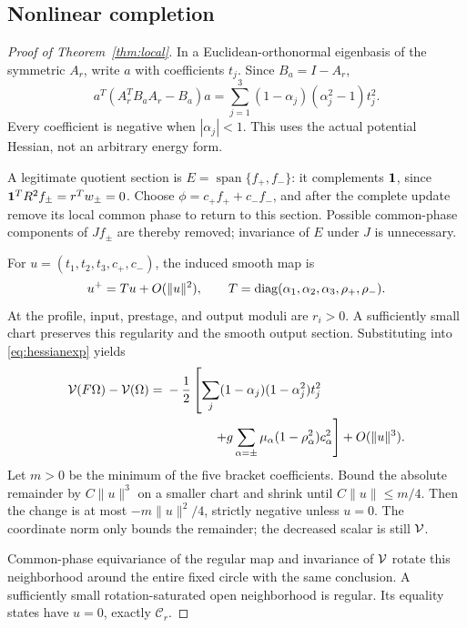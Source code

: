 \subsection{Nonlinear completion}
\begin{proof}[Proof of Theorem~\ref{thm:local}]
In a Euclidean-orthonormal eigenbasis of the symmetric \(A_r\), write \(a\) with coefficients \(t_j\). Since \(B_a=I-A_r\),
\begin{equation}
a^T(A_r^TB_aA_r-B_a)a
=\sum_{j=1}^3(1-\alpha_j)(\alpha_j^2-1)t_j^2.
\label{eq:amplitudedecrement}
\end{equation}
Every coefficient is negative when \(|\alpha_j|<1\). This uses the actual potential Hessian, not an arbitrary energy form.

A legitimate quotient section is \(E=\operatorname{span}\{f_+,f_-\}\): it complements \(\mathbf1\), since \(\mathbf1^TR^2f_\pm=r^Tw_\pm=0\). Choose \(\phi=c_+f_++c_-f_-\), and after the complete update remove its local common phase to return to this section. Possible common-phase components of \(Jf_\pm\) are thereby removed; invariance of \(E\) under \(J\) is unnecessary.

For \(u=(t_1,t_2,t_3,c_+,c_-)\), the induced smooth map is
\[
u^+=Tu+O(\|u\|^2),\qquad
T=\operatorname{diag}(\alpha_1,\alpha_2,\alpha_3,\rho_+,\rho_-).
\]
At the profile, input, prestage, and output moduli are \(r_i>0\). A sufficiently small chart preserves this regularity and the smooth output section. Substituting into \eqref{eq:hessianexp} yields
\begin{align}
\V(F\Omega)-\V(\Omega)
={}&-\frac12\left[
\sum_j(1-\alpha_j)(1-\alpha_j^2)t_j^2\right.\notag\\
&\left.\hspace{13mm}
+g\sum_{\alpha=\pm}\mu_\alpha(1-\rho_\alpha^2)c_\alpha^2
\right]+O(\|u\|^3).
\label{eq:nonlineardecrement}
\end{align}
Let \(m>0\) be the minimum of the five bracket coefficients. Bound the absolute remainder by \(C\|u\|^3\) on a smaller chart and shrink until \(C\|u\|\le m/4\). Then the change is at most \(-m\|u\|^2/4\), strictly negative unless \(u=0\). The coordinate norm only bounds the remainder; the decreased scalar is still \(\mathcal V\).

Common-phase equivariance of the regular map and invariance of \(\mathcal V\) rotate this neighborhood around the entire fixed circle with the same conclusion. A sufficiently small rotation-saturated open neighborhood is regular. Its equality states have \(u=0\), exactly \(\mathcal C_r\).
\end{proof}

